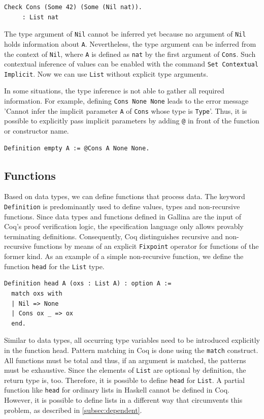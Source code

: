 \documentclass[a4paper, 11pt, fleqn, twoside]{scrreprt}
\newcommand{\cinl}[1]{\texttt{#1}}
\begin{document}
\begin{verbatim}
Check Cons (Some 42) (Some (Nil nat)).
     : List nat
\end{verbatim}

The type argument of \cinl{Nil} cannot be inferred yet because no argument of \cinl{Nil} holds information about \cinl{A}.
Nevertheless, the type argument can be inferred from the context of \cinl{Nil}, where \cinl{A} is defined as \cinl{nat} by the first argument of \cinl{Cons}.
Such contextual inference of values can be enabled with the command \cinl{Set Contextual Implicit}.
Now we can use \cinl{List} without explicit type arguments.

In some situations, the type inference is not able to gather all required information.
For example, defining \cinl{Cons None None} leads to the error message 'Cannot infer the implicit parameter \cinl{A} of \cinl{Cons} whose type is \cinl{Type}'.
Thus, it is possible to explicitly pass implicit parameters by adding \cinl{@} in front of the function or constructor name.
\begin{verbatim}
Definition empty A := @Cons A None None.
\end{verbatim}

\subsection{Functions}
\label{subsec:coqFunctions}

Based on data types, we can define functions that process data.
The keyword \cinl{Definition} is predominantly used to define values, types and non-recursive functions.
Since data types and functions defined in Gallina are the input of Coq's proof verification logic, the specification language only allows provably terminating definitions.
Consequently, Coq distinguishes recursive and non-recursive functions by means of an explicit \cinl{Fixpoint} operator for functions of the former kind.
As an example of a simple non-recursive function, we define the function \cinl{head} for the \cinl{List} type.

\begin{verbatim}
Definition head A (oxs : List A) : option A :=
  match oxs with
  | Nil => None
  | Cons ox _ => ox
  end.
\end{verbatim}

Similar to data types, all occurring type variables need to be introduced explicitly in the function head.
Pattern matching in Coq is done using the \cinl{match} construct.
All functions must be total and thus, if an argument is matched, the patterns must be exhaustive.
Since the elements of \cinl{List} are optional by definition, the return type is, too.
Therefore, it is possible to define \cinl{head} for \cinl{List}.
A partial function like \cinl{head} for ordinary lists in Haskell cannot be defined in Coq.
However, it is possible to define lists in a different way that circumvents this problem, as described in \autoref{subsec:dependent}.
\end{document}
